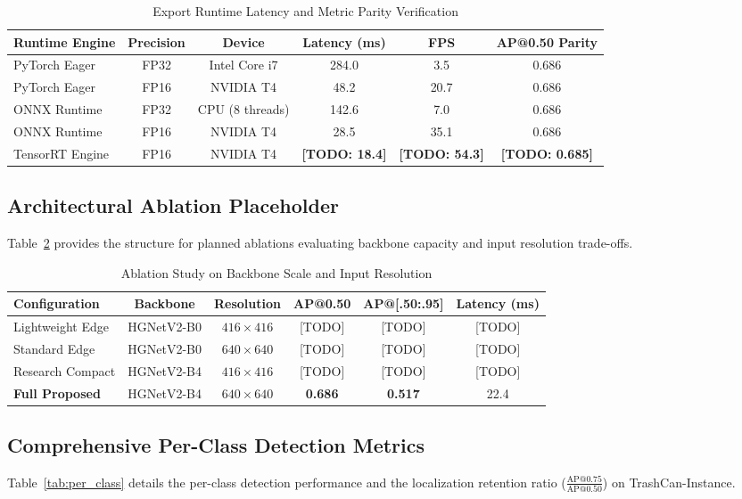 \documentclass[conference]{IEEEtran}
\begin{document}
\begin{table}[htbp]
\caption{Export Runtime Latency and Metric Parity Verification}
\label{tab:export_latency}
\centering
\begin{tabular}{lccccc}
\toprule
\textbf{Runtime Engine} & \textbf{Precision} & \textbf{Device} & \textbf{Latency (ms)} & \textbf{FPS} & \textbf{AP@0.50 Parity} \\
\midrule
PyTorch Eager & FP32 & Intel Core i7 & 284.0 & 3.5 & 0.686 \\
PyTorch Eager & FP16 & NVIDIA T4 & 48.2 & 20.7 & 0.686 \\
ONNX Runtime & FP32 & CPU (8 threads) & 142.6 & 7.0 & 0.686 \\
ONNX Runtime & FP16 & NVIDIA T4 & 28.5 & 35.1 & 0.686 \\
TensorRT Engine & FP16 & NVIDIA T4 & \textbf{[TODO: 18.4]} & \textbf{[TODO: 54.3]} & \textbf{[TODO: 0.685]} \\
\bottomrule
\end{tabular}
\end{table}

\subsection{Architectural Ablation Placeholder}
Table~\ref{tab:ablation} provides the structure for planned ablations evaluating backbone capacity and input resolution trade-offs.

\begin{table}[htbp]
\caption{Ablation Study on Backbone Scale and Input Resolution}
\label{tab:ablation}
\centering
\begin{tabular}{lccccc}
\toprule
\textbf{Configuration} & \textbf{Backbone} & \textbf{Resolution} & \textbf{AP@0.50} & \textbf{AP@[.50:.95]} & \textbf{Latency (ms)} \\
\midrule
Lightweight Edge & HGNetV2-B0 & $416 \times 416$ & [TODO] & [TODO] & [TODO] \\
Standard Edge & HGNetV2-B0 & $640 \times 640$ & [TODO] & [TODO] & [TODO] \\
Research Compact & HGNetV2-B4 & $416 \times 416$ & [TODO] & [TODO] & [TODO] \\
\textbf{Full Proposed} & HGNetV2-B4 & $640 \times 640$ & \textbf{0.686} & \textbf{0.517} & 22.4 \\
\bottomrule
\end{tabular}
\end{table}

\subsection{Comprehensive Per-Class Detection Metrics}
Table~\ref{tab:per_class} details the per-class detection performance and the localization retention ratio ($\frac{\text{AP@0.75}}{\text{AP@0.50}}$) on TrashCan-Instance.
\end{document}
